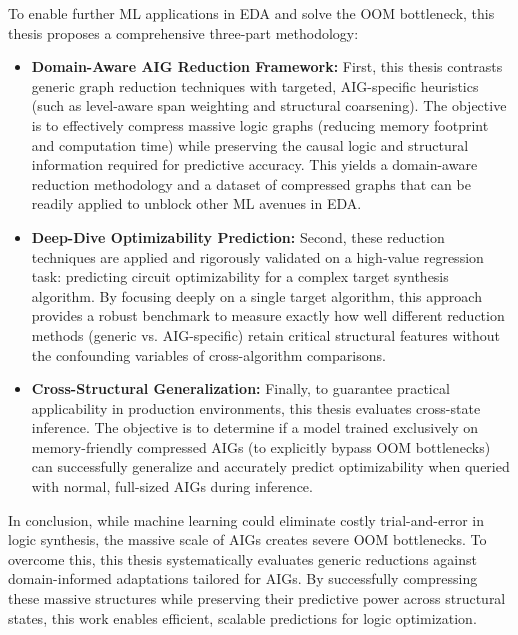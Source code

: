 \documentclass[paper=a4, fontsize=11pt]{scrartcl} %
\numberwithin{equation}{section} %
\numberwithin{figure}{section} %
\numberwithin{table}{section} %
\begin{document}
To enable further ML applications in EDA and solve the OOM bottleneck, this thesis proposes a comprehensive three-part methodology:
\begin{itemize}
    \item \textbf{Domain-Aware AIG Reduction Framework:} First, this thesis contrasts generic graph reduction techniques with targeted, AIG-specific heuristics (such as level-aware span weighting and structural coarsening). The objective is to effectively compress massive logic graphs (reducing memory footprint and computation time) while preserving the causal logic and structural information required for predictive accuracy. This yields a domain-aware reduction methodology and a dataset of compressed graphs that can be readily applied to unblock other ML avenues in EDA.
    \item \textbf{Deep-Dive Optimizability Prediction:} Second, these reduction techniques are applied and rigorously validated on a high-value regression task: predicting circuit optimizability for a complex target synthesis algorithm. By focusing deeply on a single target algorithm, this approach provides a robust benchmark to measure exactly how well different reduction methods (generic vs. AIG-specific) retain critical structural features without the confounding variables of cross-algorithm comparisons.
    \item \textbf{Cross-Structural Generalization:} Finally, to guarantee practical applicability in production environments, this thesis evaluates cross-state inference. The objective is to determine if a model trained exclusively on memory-friendly compressed AIGs (to explicitly bypass OOM bottlenecks) can successfully generalize and accurately predict optimizability when queried with normal, full-sized AIGs during inference.
\end{itemize}

In conclusion, while machine learning could eliminate costly trial-and-error in logic synthesis, the massive scale of AIGs creates severe OOM bottlenecks. To overcome this, this thesis systematically evaluates generic reductions against domain-informed adaptations tailored for AIGs. By successfully compressing these massive structures while preserving their predictive power across structural states, this work enables efficient, scalable predictions for logic optimization.
\end{document}
